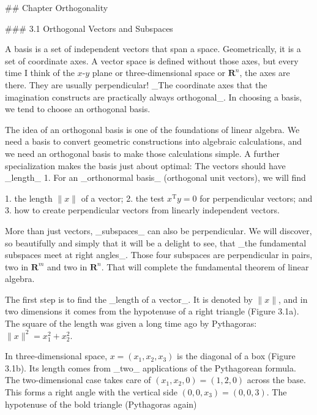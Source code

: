 

## Chapter Orthogonality

### 3.1 Orthogonal Vectors and Subspaces

A basis is a set of independent vectors that span a space. Geometrically, it is a set of coordinate axes. A vector space is defined without those axes, but every time I think of the \(x\)-\(y\) plane or three-dimensional space or \(\mathbf{R}^{n}\), the axes are there. They are usually perpendicular! _The coordinate axes that the imagination constructs are practically always orthogonal_. In choosing a basis, we tend to choose an orthogonal basis.

The idea of an orthogonal basis is one of the foundations of linear algebra. We need a basis to convert geometric constructions into algebraic calculations, and we need an orthogonal basis to make those calculations simple. A further specialization makes the basis just about optimal: The vectors should have _length_ 1. For an _orthonormal basis_ (orthogonal unit vectors), we will find

1. the length \(\|x\|\) of a vector;
2. the test \(x^{\mathrm{T}}y=0\) for perpendicular vectors; and
3. how to create perpendicular vectors from linearly independent vectors.

More than just vectors, _subspaces_ can also be perpendicular. We will discover, so beautifully and simply that it will be a delight to see, that _the fundamental subspaces meet at right angles_. Those four subspaces are perpendicular in pairs, two in \(\mathbf{R}^{m}\) and two in \(\mathbf{R}^{n}\). That will complete the fundamental theorem of linear algebra.

The first step is to find the _length of a vector_. It is denoted by \(\|x\|\), and in two dimensions it comes from the hypotenuse of a right triangle (Figure 3.1a). The square of the length was given a long time ago by Pythagoras: \(\|x\|^{2}=x_{1}^{2}+x_{2}^{2}\).

In three-dimensional space, \(x=(x_{1},x_{2},x_{3})\) is the diagonal of a box (Figure 3.1b). Its length comes from _two_ applications of the Pythagorean formula. The two-dimensional case takes care of \((x_{1},x_{2},0)=(1,2,0)\) across the base. This forms a right angle with the vertical side \((0,0,x_{3})=(0,0,3)\). The hypotenuse of the bold triangle (Pythagoras again)